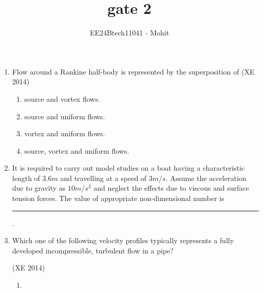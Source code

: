 \documentclass[journal,12pt,onecolumn]{IEEEtran}
\theoremstyle{remark}
\begin{document}
\title{gate 2}
\author{EE24Btech11041 - Mohit}
\maketitle
\renewcommand{\thefigure}{\theenumi}
\renewcommand{\thetable}{\theenumi}


\begin{enumerate}

\item Flow around a Rankine half-body is represented by the superposition of
\hfill{(XE 2014)}
\begin{multicols}{4}
\begin{enumerate}

\item source and vortex flows.
\item source and uniform flows.
\item vortex and uniform flows.
\item source, vortex and uniform flows.

\end{enumerate}
\end{multicols}

\item It is required to carry out model studies on a boat having a characteristic length of $3.6 m$ and travelling at a speed of $3 m/s$. Assume the acceleration due to gravity as $10 m/s^{2}$ and neglect the effects due to viscous and surface tension forces. The value of appropriate non-dimensional number is \rule{2cm}{0.4pt}.

\item Which one of the following velocity profiles typically represents a fully developed incompressible, turbulent flow in a pipe? 

\hfill{(XE 2014)}
\begin{multicols}{4}
\begin{enumerate}

\item 



\end{enumerate}
\end{multicols}
\end{enumerate}
\end{document}
